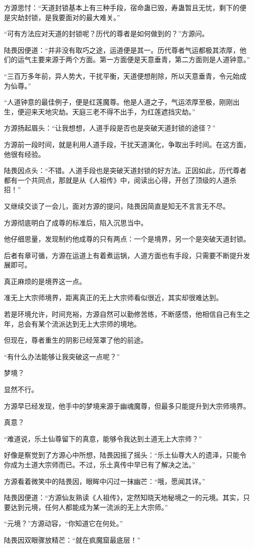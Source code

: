\begin{this_body}
方源思忖：“天道封锁基本上有三种手段，宿命蛊已毁，寿蛊暂且无忧，剩下的便是灾劫封锁，是我要面对的最大难关。”

“可有方法应对天道的封锁呢？历代的尊者是如何做到的？”方源问。

陆畏因便道：“并非没有取巧之途，运道便是其一。历代尊者气运都极其浓厚，他们的运气主要来源于两个方面。第一方面便是天意垂青，第二方面则是人道钟意。”

“三百万多年前，异人势大，干扰平衡，天道便想削除，所以天意垂青，令元始成为仙尊。”

“人道钟意的最佳例子，便是红莲魔尊。他是人道之子，气运浓厚至极，刚刚出生，便迎来天地灾劫。天庭三老不得不出手，为红莲遮挡灾劫。”

方源扬起眉头：“让我想想，人道手段是否也是突破天道封锁的途径？”

方源前一段时间，就是利用人道手段，干扰天道演化，争取出手时间。在这方面，他很有经验。

陆畏因点头：“不错。人道手段也是突破天道封锁的好方法。正因如此，历代尊者都有一个共同点，那就是从《人祖传》中，阅读出心得，开创了顶级的人道杀招！”

又继续交谈了一会儿，面对方源的提问，陆畏因简直是知无不言言无不尽。

方源彻底明白了成尊的标准后，陷入沉思当中。

他仔细思量，发现制约他成尊的只有两点：一个是境界，另一个是突破天道封锁。

后者有章可循，方源在运道上有着煮运锅，人道方面也有手段，只需要不断提升发展即可。

真正麻烦的是境界这一点。

准无上大宗师境界，距离真正的无上大宗师看似很近，其实却很难达到。

若是环境允许，时间充裕，方源自然可以勤修苦练，不断感悟，他相信自己有生之年，总会有某个流派达到无上大宗师的境地。

但现在，尊者重生的阴影已经笼罩了他的前途。

“有什么办法能够让我突破这一点呢？”

梦境？

显然不行。

方源早已经发现，他手中的梦境来源于幽魂魔尊，但最多只能提升到大宗师境界。

真意？

“难道说，乐土仙尊留下的真意，能够令我达到土道无上大宗师？”

好像是察觉到了方源心中所想，陆畏因摇了摇头：“乐土仙尊大人的遗泽，只能令你成为土道大宗师而已。不过，乐土真传中早已有了解决之法。”

方源看着微笑中的陆畏因，眼眸中闪过一抹幽芒：“哦，愿闻其详。”

陆畏因便道：“方源仙友熟读《人祖传》，定然知晓天地秘境之一的元境。其实，只要达到元境，任何人都能成为某一流派的无上大宗师。”

“元境？”方源动容，“你知道它在何处。”

陆畏因双眼骤放精芒：“就在疯魔窟最底层！”

\end{this_body}

